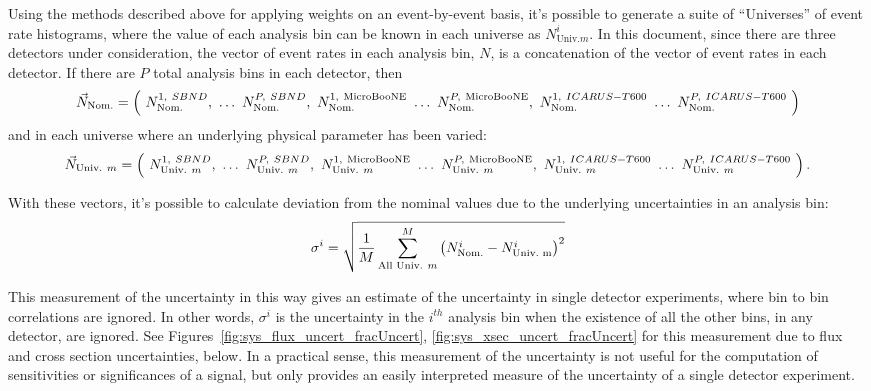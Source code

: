 Using the methods described above for applying weights on an event-by-event basis, it's possible to generate a suite of ``Universes'' of event rate histograms, where the value of each analysis bin can be known in each universe as $N^i_{\text{Univ.} m}.$  In this document, since there are three detectors under consideration, the vector of event rates in each analysis bin, $N$, is a concatenation of the vector of event rates in each detector.  If there are $P$ total analysis bins in each detector, then 
\begin{equation}
\begin{centering}
\vec{N}_{\text{Nom.}} = \left(~N_{\text{Nom.}}^{1,~SBND},~\dots~N_{\text{Nom.}}^{P,~SBND},~N_{\text{Nom.}}^{1,~\uboone}~\dots~N_{\text{Nom.}}^{P,~\uboone},~N_{\text{Nom.}}^{1,~\icarus}~\dots~N_{\text{Nom.}}^{P,~\icarus} ~\right)
\end{centering}
\end{equation}
and in each universe where an underlying physical parameter has been varied:
\begin{equation}
\begin{centering}
\vec{N}_{\text{Univ.}~m} = \left(~N_{\text{Univ.}~m}^{1,~SBND},~\dots~N_{\text{Univ.}~m}^{P,~SBND},~N_{\text{Univ.}~m}^{1,~\uboone}~\dots~N_{\text{Univ.}~m}^{P,~\uboone},~N_{\text{Univ.}~m}^{1,~\icarus}~\dots~N_{\text{Univ.}~m}^{P,~\icarus} ~\right).
\end{centering}
\end{equation}

With these vectors, it's possible to calculate deviation from the nominal values due to the underlying uncertainties in an analysis bin:
\begin{equation}
\begin{centering}
\sigma^i = \sqrt{\frac{1}{M}\sum_{\text{All Univ.}~m}^{M} \left( N^i_{\text{Nom.}} - N^i_{\text{Univ.~m}}\right)^2}
\end{centering}
\label{eq:bin_uncert}
\end{equation}

This measurement of the uncertainty in this way gives an estimate of the uncertainty in single detector experiments, where bin to bin correlations are ignored.  In other words, $\sigma^i$ is the uncertainty in the $i^{th}$ analysis bin when the existence of all the other bins, in any detector, are ignored.  See Figures~\ref{fig:sys_flux_uncert_fracUncert}, \ref{fig:sys_xsec_uncert_fracUncert} for this measurement due to flux and cross section uncertainties, below.  In a practical sense, this measurement of the uncertainty is not useful for the computation of sensitivities or significances of a signal, but only provides an easily interpreted measure of the uncertainty of a single detector experiment.

